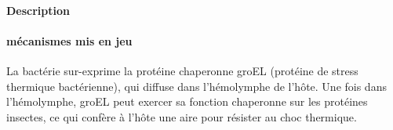 \paragraph{Description} %
\label{par:description_groel}

 \cite{stoll2009}

\paragraph{mécanismes mis en jeu} %
\label{par:process_groel}

La bactérie sur-exprime la protéine chaperonne groEL (protéine de stress
thermique bactérienne), qui diffuse dans l'hémolymphe de l'hôte. Une fois dans l'hémolymphe, groEL peut exercer sa fonction chaperonne sur les protéines insectes, ce qui confère à l'hôte une aire pour résister au choc thermique.
